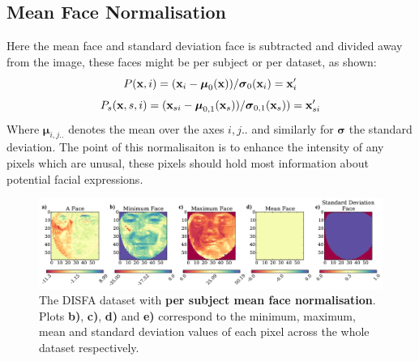 \subsection{Mean Face Normalisation}
Here the mean face and standard deviation face is subtracted and divided away from the
image, these faces might be per subject or per dataset, as shown:
\begin{equation}
  P({\bf x},i) =  ({\bf x}_{i} - {\boldsymbol \mu}_0( {\bf x}))/{\boldsymbol \sigma}_0({\bf x}_{i})  = {\bf x}_{i}'
\end{equation}
\begin{equation}
  P_s({\bf x},s,i) = ({\bf x}_{si} - {\boldsymbol \mu}_{0,1}( {\bf x}_s))/{\boldsymbol \sigma}_{0,1}( {\bf x}_s))  = {\bf x}_{si}'
\end{equation}
Where ${\boldsymbol \mu}_{i,j..}$ denotes the mean over the axes $i,j..$ and
similarly for ${\boldsymbol \sigma} $ the standard deviation.
The point of this normalisaiton is to enhance the intensity of any pixels which
are unusal, these pixels should hold most information about potential facial expressions.
\begin{figure}[!h] \centering
\includegraphics[width =\hsize]{figures/faces_per_subject_face.pdf}
\caption{The DISFA dataset with {\bf per subject mean face normalisation}.
Plots {\bf b)}, {\bf c)}, {\bf d)} and {\bf e)} correspond to the minimum,
maximum, mean and standard deviation values of each pixel across the whole
dataset respectively.}
\label{fig:}
\end{figure}
